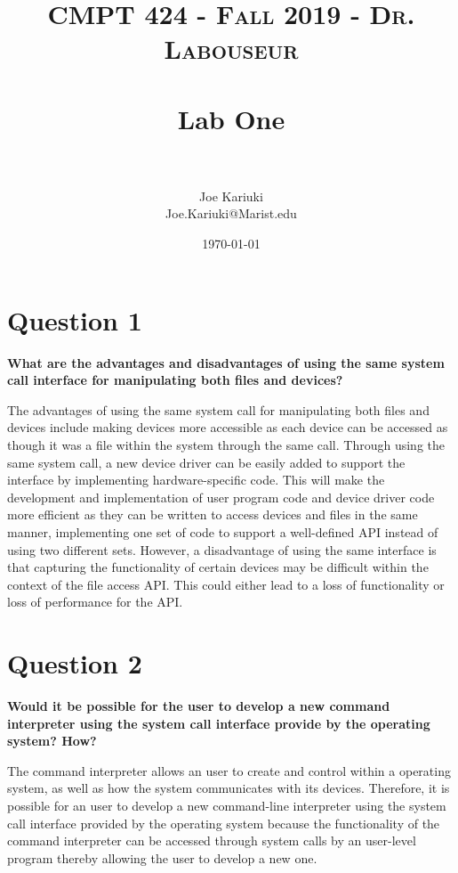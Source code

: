 \documentclass[letterpaper, 10pt,DIV=13]{scrartcl}
\title{	
   \normalfont \normalsize 
   \textsc{CMPT 424 - Fall 2019 - Dr. Labouseur} \\[10pt] %
   \horrule{0.5pt} \\[0.25cm] 	%
   \huge Lab One  \\     	    %
   \horrule{0.5pt} \\[0.25cm] 	%
}
\author{Joe Kariuki \\ \normalsize Joe.Kariuki@Marist.edu}
\date{\normalsize\today} 	%
\numberwithin{equation}{section} %
\numberwithin{figure}{section} %
\numberwithin{table}{section} %
\begin{document}
\maketitle %

\section{Question 1}

\textbf{What are the advantages and disadvantages of using the same system call interface for manipulating both files and devices?
}

The advantages of using the same system call for manipulating both files and devices include making devices more accessible as each device can be accessed as though it was a file within the system through the same call. Through  
using the same system call, a new device driver can be easily added to support the interface by implementing hardware-specific code. This will make the development and implementation of user program code and device driver code more efficient as they can be written to access devices and files in the same manner, implementing one set of code to support a well-defined API instead of using two different sets. However, a disadvantage of using the same interface is that capturing the functionality of certain devices may be difficult within the context of the file access API. This could either lead to a loss of functionality or loss of performance for the API.


\section{Question 2}
\textbf{Would it be possible for the user to develop a new command interpreter using the system call interface provide by the operating system? How?
}

The  command interpreter  allows an user to create and control within a operating system, as well as how the system communicates with its devices.  Therefore, it is possible for an user to develop a new command-line interpreter  using the system call interface provided by the operating system because the functionality of the command interpreter can be accessed through system calls by an user-level program thereby allowing the user to develop a new one.
\end{document}
